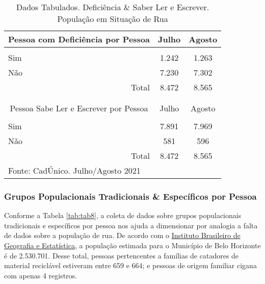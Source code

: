 \documentclass[12pt]{article}
\begin{document}
\begin{table}[htbp]
  \centering
  \caption{Dados Tabulados. Deficiência \& Saber Ler e Escrever. População em Situação de Rua}
    \begin{tabular}{p{23.5em}rr}
    \hline
    \multicolumn{1}{c}{Pessoa com Deficiência por Pessoa} & \multicolumn{1}{c}{Julho} & \multicolumn{1}{c}{Agosto} \\
    \midrule
    \multicolumn{1}{c}{} &      &  \\
    \multicolumn{1}{l}{Sim} & \multicolumn{1}{c}{1.242} & \multicolumn{1}{c}{1.263} \\
    \multicolumn{1}{l}{Não} & \multicolumn{1}{c}{7.230} & \multicolumn{1}{c}{7.302} \\
    \midrule
    \multicolumn{1}{r}{Total} & \multicolumn{1}{c}{8.472} & \multicolumn{1}{c}{8.565} \\
    \midrule
    \multicolumn{1}{r}{} &      &  \\
    \multicolumn{1}{r}{} &      &  \\
    \midrule
    \multicolumn{1}{c}{Pessoa Sabe Ler e Escrever por Pessoa} & \multicolumn{1}{c}{Julho} & \multicolumn{1}{c}{Agosto} \\
    \midrule
    \multicolumn{1}{c}{} &      &  \\
    \multicolumn{1}{l}{Sim} & \multicolumn{1}{c}{7.891} & \multicolumn{1}{c}{7.969} \\
    \multicolumn{1}{l}{Não} & \multicolumn{1}{c}{581} & \multicolumn{1}{c}{596} \\
    \midrule
    \multicolumn{1}{r}{Total} & \multicolumn{1}{c}{8.472} & \multicolumn{1}{c}{8.565} \\
    \midrule
    Fonte: CadÚnico. Julho/Agosto 2021 &      &  \\
    \end{tabular}%
  \label{tab:tab7}%
\end{table}%

\subsubsection{Grupos Populacionais Tradicionais \& Específicos por Pessoa}

Conforme a Tabela \ref{tab:tab8}, a coleta de dados sobre grupos populacionais tradicionais e específicos por pessoa nos ajuda a dimensionar por analogia a falta de dados sobre a população de rua. De acordo com o \href{https://cidades.ibge.gov.br/brasil/mg/belo-horizonte/panorama}{Instituto Brasileiro de Geografia e Estatística}, a população estimada para o Município de Belo Horizonte é de 2.530.701. Desse total, pessoas pertencentes a famílias de catadores de material reciclável estiveram entre 659 e 664; e pessoas de origem familiar cigana com apenas 4 registros.\\ 
\end{document}
